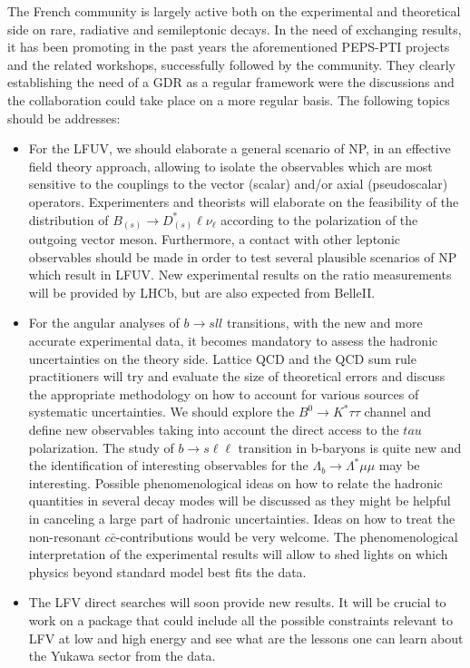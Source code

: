 The French community is largely active both on the experimental and theoretical side on rare, radiative and semileptonic decays.  In the need of exchanging results, it has been promoting in the past years the aforementioned PEPS-PTI projects and the related workshops, successfully followed by the community. They clearly establishing the need of a GDR as a regular framework  were the discussions and the collaboration could take place on a more regular basis. The following topics should be addresses:
\begin{itemize}
\item For the LFUV, we should elaborate a general scenario of NP, in an effective field theory approach, allowing to isolate the  observables  which are most sensitive to the couplings to the vector (scalar) and/or axial (pseudoscalar) operators. Experimenters and theorists will elaborate on the feasibility of the distribution of $B_{(s)}\to D_{(s)}^\ast  \ell \nu_\ell$ according to the polarization of the outgoing vector meson. Furthermore, a contact with other leptonic observables should be made in order to test several plausible scenarios of NP which result in LFUV. New experimental results on the ratio measurements will be provided by LHCb, but are also expected from BelleII. 
\item For the angular analyses of $b \to sll$ transitions, with the new and more accurate experimental data, it becomes mandatory to assess the hadronic uncertainties on the theory side. Lattice QCD and the QCD sum rule practitioners will try and 
evaluate the size of theoretical errors and discuss the appropriate methodology on how to account for various sources of systematic uncertainties. We should explore the  $B^0\to K^\ast \tau\tau$ channel and define new observables taking into account the direct access to the $tau$ polarization. The study of $b \to s \ell \ell$ transition in b-baryons  is quite new and the identification of interesting observables for the $\Lambda_b \to \Lambda^\ast \mu\mu$ may be interesting.  
Possible phenomenological ideas on how to relate the hadronic quantities in several decay modes will be discussed as they might be helpful in canceling a large part of hadronic uncertainties.
Ideas on how to treat the non-resonant $c\bar c$-contributions would be very welcome. The phenomenological interpretation of the experimental results will allow to shed lights on which physics beyond standard model best fits the data. 
\item The LFV direct searches will soon provide new results. It will be crucial to work on a package that could include all the possible constraints relevant to LFV at low and high energy and see what are the lessons one can learn about the Yukawa sector from the data. 

\end{itemize}
